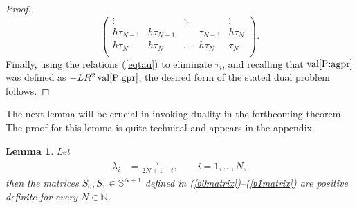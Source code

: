 \documentclass[12pt]{article}
\numberwithin{equation}{section}
\newtheorem{lemma}{Lemma}[section]
\theoremstyle{definition}
\theoremstyle{remark}
\DeclareMathOperator{\val}{val}
\begin{document}
\begin{proof}
{\[\begin{pmatrix}
        \vdots  & & \ddots &     &\vdots \\
        h\tau_{N-1}     & h\tau_{N-1}   &           & \tau_{N-1}        & h\tau_N \\
        h\tau_N         & h\tau_N & \dots       & h\tau_N   & \tau_N \\
    \end{pmatrix}.
\]
}
Finally,  using the relations (\ref{eqtau}) to eliminate $\tau_i$, and recalling that
$\val\!\eqref{P:agpr}$ was defined as $-LR^2 \val\!\eqref{P:gpr}$, the desired form of the stated dual problem
follows.
\end{proof}



The next lemma will be crucial in invoking duality in the forthcoming theorem.
The proof for this lemma is quite technical and appears in the appendix.
\begin{lemma} \label{L:positivedefinitea0a1}
Let
\begin{align*}
    \lambda_i &= \frac{i}{2 N+1-i},\qquad i=1,\dots,N,
\end{align*}
then the matrices $S_0, S_1 \in \mathbb{S}^{N+1}$ defined in (\ref{b0matrix})--(\ref{b1matrix})
are positive definite for every $N\in\mathbb{N}$.
\end{lemma}
\end{document}
